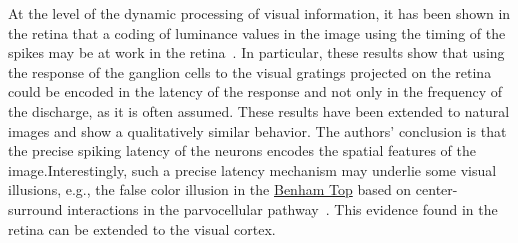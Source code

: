 \documentclass[brainsci, %
               review,submit,pdftex,moreauthors%
               ]{Definitions/mdpi}
\begin{document}

%
At the level of the dynamic processing of visual information, it has been shown in the retina that a coding of luminance values in the image using the timing of the spikes may be at work in the retina~\citep{gollisch_rapid_2008}. In particular, these results show that using  the response of the ganglion cells to the visual gratings projected on the retina could be encoded in the latency of the response and not only in the frequency of the discharge, as it is often assumed. These results have been extended to natural images and show a qualitatively similar behavior. The authors' conclusion is that the precise spiking latency of the neurons encodes the spatial features of the image.Interestingly, such a precise latency mechanism may underlie some visual illusions, e.g., the false color illusion in the \href{https://michaelbach.de/ot/col-Benham/index.html}{Benham Top} based on center-surround interactions in the parvocellular pathway~\citep{kenyon_theory_2004}. This evidence found in the retina  can be extended to the visual cortex.
\end{document}
